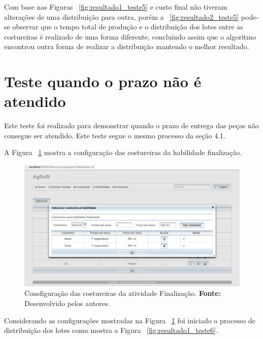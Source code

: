 \par Com base nas Figuras ~\ref{fig:resultado1_teste5} e
custo final não tiveram alterações de uma distribuição para outra, porém a
~\ref{fig:resultado2_teste5} pode-se observar que o tempo total de produção e o
distribuição dos lotes entre as costureiras é realizado de uma forma
diferente, concluindo assim que o algoritmo encontrou outra forma de realizar a
distribuição mantendo o melhor resultado.

\section{Teste quando o prazo não é atendido}

\par Este teste foi realizado para demonstrar quando o prazo de entrega das
peças não consegue ser atendido. Este teste segue o mesmo processo da seção 4.1.

\par A Figura ~\ref{fig:configuracao_costureiras_teste6} mostra a configuração
das costureiras da habilidade finalização.

\begin{figure}[h!]
	\centerline{\includegraphics[scale=0.3]{./imagens/configuracao_costureiras_teste6.png}}
	\caption[Configuração das costureiras da atividade Finalização.] 
	{Consfiguração das costureiras da atividade Finalização. \textbf{Fonte:} Desenvolvido pelos
	autores.}
	\label{fig:configuracao_costureiras_teste6}
\end{figure}

\par Considerando as configurações mostradas na Figura
~\ref{fig:configuracao_costureiras_teste6} foi iniciado o processo de
distribuição dos lotes como mostra a Figura ~\ref{fig:resultado1_teste6}.

